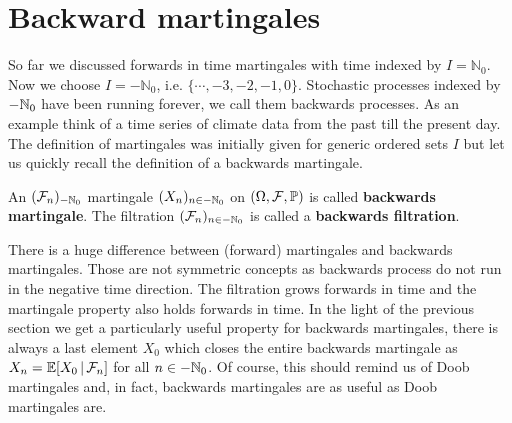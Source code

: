 \section{Backward martingales}
So far we discussed forwards in time martingales with time indexed by $I =\mathbb{N}_0$. Now we choose $I = -\mathbb{N}_0$, i.e. $\{\cdots,-3,-2,-1,0\}$. Stochastic processes indexed by $-\N_0$ have been running forever, we call them backwards processes. As an example think of a time series of climate data from the past till the present day. The definition of martingales was initially given for generic ordered sets $I$ but let us quickly recall the definition of a backwards martingale.
\begin{ldef}
\begin{deff}
	An $(\mathcal F_n)_{-\N_0}$ martingale $(X_n)_{n\in-\N_0}$  on $(\Omega, \mathcal F, \P)$ is called \textbf{backwards martingale}. The filtration $(\mathcal F_n)_{n\in-\N_0}$ is called a \textbf{backwards filtration}.

\end{deff}
\end{ldef}
There is a huge difference between (forward) martingales and backwards martingales. Those are not symmetric concepts as backwards process do not run in the negative time direction. The filtration grows forwards in time and the martingale property also holds forwards in time. In the light of the previous section we get a particularly useful property for backwards martingales, there is always a last element $X_0$ which closes the entire backwards martingale as $X_{n} = \E[X_0\,|\,\cF_{n}]$ for all $n\in -\N_0$. Of course, this should remind us of Doob martingales and, in fact, backwards martingales are as useful as Doob martingales are.
